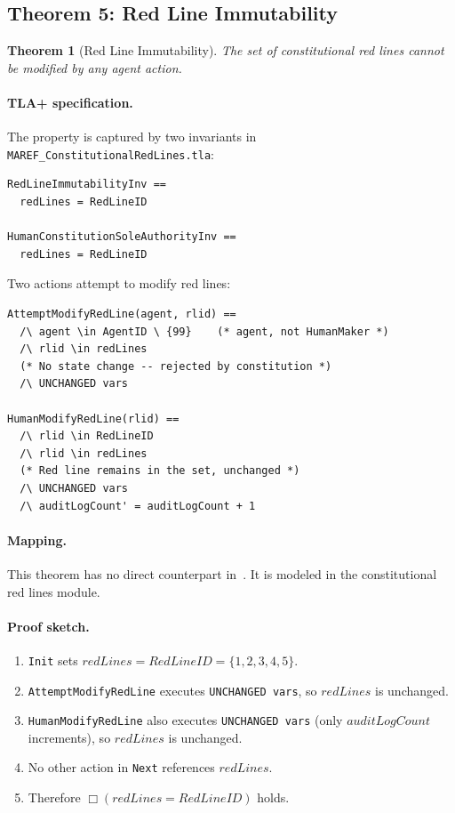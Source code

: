 \documentclass[11pt]{article}
\newtheorem{theorem}{Theorem}
\begin{document}
\subsection{Theorem 5: Red Line Immutability}

\begin{theorem}[Red Line Immutability]
The set of constitutional red lines cannot be modified by any agent action.
\end{theorem}

\paragraph{TLA+ specification.} The property is captured by two invariants in
\texttt{MAREF\_ConstitutionalRedLines.tla}:

\begin{lstlisting}
RedLineImmutabilityInv ==
  redLines = RedLineID

HumanConstitutionSoleAuthorityInv ==
  redLines = RedLineID
\end{lstlisting}

Two actions attempt to modify red lines:

\begin{lstlisting}
AttemptModifyRedLine(agent, rlid) ==
  /\ agent \in AgentID \ {99}    (* agent, not HumanMaker *)
  /\ rlid \in redLines
  (* No state change -- rejected by constitution *)
  /\ UNCHANGED vars

HumanModifyRedLine(rlid) ==
  /\ rlid \in RedLineID
  /\ rlid \in redLines
  (* Red line remains in the set, unchanged *)
  /\ UNCHANGED vars
  /\ auditLogCount' = auditLogCount + 1
\end{lstlisting}

\paragraph{Mapping.} This theorem has no direct counterpart
in~\cite{maref-w3}. It is modeled in the constitutional red lines module.

\paragraph{Proof sketch.}
\begin{enumerate}
  \item \texttt{Init} sets $\mathit{redLines} = \mathit{RedLineID} = \{1,2,3,4,5\}$.
  \item \texttt{AttemptModifyRedLine} executes \texttt{UNCHANGED vars}, so
    $\mathit{redLines}$ is unchanged.
  \item \texttt{HumanModifyRedLine} also executes \texttt{UNCHANGED vars}
    (only $\mathit{auditLogCount}$ increments), so $\mathit{redLines}$ is
    unchanged.
  \item No other action in \texttt{Next} references $\mathit{redLines}$.
  \item Therefore $\Box(\mathit{redLines} = \mathit{RedLineID})$ holds.
\end{enumerate}
\end{document}
